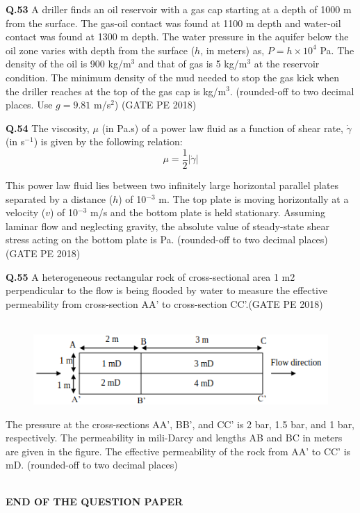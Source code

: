 \documentclass[journal,12pt,onecolumn]{IEEEtran}
\theoremstyle{remark}
\begin{document}
\vspace{1cm}

\noindent\textbf{Q.53} A driller finds an oil reservoir with a gas cap starting at a depth of 1000 m from the surface. The gas-oil contact was found at 1100 m depth and water-oil contact was found at 1300 m depth. The water pressure in the aquifer below the oil zone varies with depth from the surface ($h$, in meters) as, $P = h \times 10^4$ Pa. The density of the oil is 900 kg/m$^3$ and that of gas is 5 kg/m$^3$ at the reservoir condition. The minimum density of the mud needed to stop the gas kick when the driller reaches at the top of the gas cap is \underline{\hspace{2cm}} kg/m$^3$. (rounded-off to two decimal places. Use $g = 9.81$ m/s$^2$) \hfill (GATE PE 2018)

\vspace{0.7cm}

\noindent\textbf{Q.54} The viscosity, $\mu$ (in Pa.s) of a power law fluid as a function of shear rate, $\dot{\gamma}$ (in s$^{-1}$) is given by the following relation: 
\[ \mu = \frac{1}{2} |\dot{\gamma}| \]

This power law fluid lies between two infinitely large horizontal parallel plates separated by a distance ($h$) of 10$^{-3}$ m. The top plate is moving horizontally at a velocity ($v$) of 10$^{-3}$ m/s and the bottom plate is held stationary. Assuming laminar flow and neglecting gravity, the absolute value of steady-state shear stress acting on the bottom plate is \underline{\hspace{2cm}} Pa. (rounded-off to two decimal places) \hfill (GATE PE 2018)

\pagebreak

\noindent
\textbf{Q.55} A heterogeneous rectangular rock of cross-sectional area 1 m2 perpendicular to the flow is
being flooded by water to measure the effective permeability from cross-section AA’ to
cross-section CC’.\hfill(GATE PE 2018)\\\\

\begin{figure}[h!]
  \centering
  \includegraphics[width=0.8\columnwidth]{pic12.png} 
\end{figure}

The pressure at the cross-sections AA’, BB’, and CC’ is 2 bar, 1.5 bar, and 1 bar,
respectively. The permeability in mili-Darcy and lengths AB and BC in meters are given in
the figure. The effective permeability of the rock from AA’ to CC’ is \underline{\hspace{4cm}}mD. 
(rounded-off to two decimal places)\\\\
\vspace{6cm}
\begin{center}
	{\LARGE \textbf{END OF THE QUESTION PAPER}}
\end{center}
\end{document}
